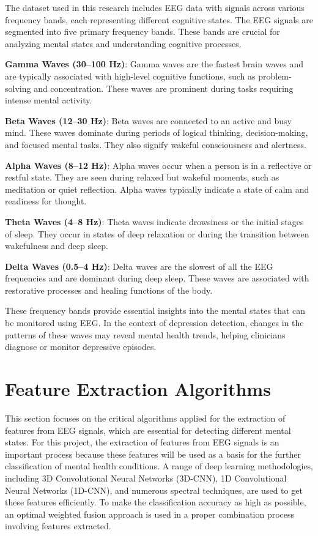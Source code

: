 \documentclass[conference]{IEEEtran}
\begin{document}
The dataset used in this research includes EEG data with signals across various frequency bands, each representing different cognitive states. The EEG signals are segmented into five primary frequency bands. These bands are crucial for analyzing mental states and understanding cognitive processes.

\textbf{Gamma Waves (30–100 Hz)}: Gamma waves are the fastest brain waves and are typically associated with high-level cognitive functions, such as problem-solving and concentration. These waves are prominent during tasks requiring intense mental activity.

\textbf{Beta Waves (12–30 Hz)}: Beta waves are connected to an active and busy mind. These waves dominate during periods of logical thinking, decision-making, and focused mental tasks. They also signify wakeful consciousness and alertness.

\textbf{Alpha Waves (8–12 Hz)}: Alpha waves occur when a person is in a reflective or restful state. They are seen during relaxed but wakeful moments, such as meditation or quiet reflection. Alpha waves typically indicate a state of calm and readiness for thought.

\textbf{Theta Waves (4–8 Hz)}: Theta waves indicate drowsiness or the initial stages of sleep. They occur in states of deep relaxation or during the transition between wakefulness and deep sleep.

\textbf{Delta Waves (0.5–4 Hz)}: Delta waves are the slowest of all the EEG frequencies and are dominant during deep sleep. These waves are associated with restorative processes and healing functions of the body.

These frequency bands provide essential insights into the mental states that can be monitored using EEG. In the context of depression detection, changes in the patterns of these waves may reveal mental health trends, helping clinicians diagnose or monitor depressive episodes.

\section{Feature Extraction Algorithms}

This section focuses on the critical algorithms applied for the extraction of features from EEG signals, which are essential for detecting different mental states. For this project, the extraction of features from EEG signals is an important process because these features will be used as a basis for the further classification of mental health conditions. A range of deep learning methodologies, including 3D Convolutional Neural Networks (3D-CNN), 1D Convolutional Neural Networks (1D-CNN), and numerous spectral techniques, are used to get these features efficiently. To make the classification accuracy as high as possible, an optimal weighted fusion approach is used in a proper combination process involving features extracted.
\end{document}
